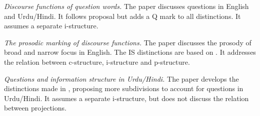 \documentclass[output=paper,hidelinks]{langscibook}
\begin{document}

\vspace{+6pt}
\citet{Mycock2013} \textit{Discourse functions of question words.} The paper discusses questions in English and Urdu/Hindi. It follows  proposal but adds a Q mark to all distinctions. It assumes a separate i-structure. 


\vspace{+6pt}
\citet{MycockLowe2013} \textit{The prosodic marking of discourse functions.} The paper discusses the prosody of broad and narrow focus in English. The IS distinctions are based on \citet{DN}. It addresses the relation between c-structure, i-structure and p-structure.


\vspace{+6pt}
\citet{Butt14} \textit{Questions and information structure in Urdu/Hindi.} The paper develops the distinctions made in \citet{BK96}, proposing more subdivisions to account for questions in Urdu/Hindi. It assumes a separate i-structure, but does not discuss the relation between projections.
\end{document}
